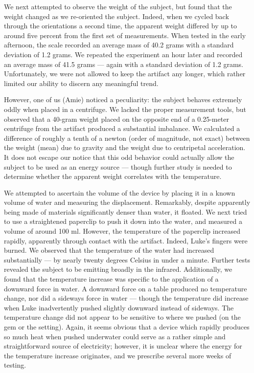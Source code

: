\documentclass[10pt]{article}
\begin{document}
We next attempted to observe the weight of the subject, but found that the weight changed as we re-oriented the subject.
Indeed, when we cycled back through the orientations a second time, the apparent weight differed by up to around five percent from the first set of measurements.
When tested in the early afternoon, the scale recorded an average mass of 40.2 grams with a standard deviation of 1.2 grams.
We repeated the experiment an hour later and recorded an average mass of 41.5 grams --- again with a standard deviation of 1.2 grams.
Unfortunately, we were not allowed to keep the artifact any longer, which rather limited our ability to discern any meaningful trend.

However, one of us (Amie) noticed a peculiarity: the subject behaves extremely oddly when placed in a centrifuge.
We lacked the proper measurement tools, but observed that a 40-gram weight placed on the opposite end of a 0.25-meter centrifuge from the artifact produced a substantial imbalance.
We calculated a difference of roughly a tenth of a newton (order of magnitude, not exact) between the weight (mean) due to gravity and the weight due to centripetal acceleration.
It does not escape our notice that this odd behavior could actually allow the subject to be used as an energy source --- though further study is needed to determine whether the apparent weight correlates with the temperature.

We attempted to ascertain the volume of the device by placing it in a known volume of water and measuring the displacement.
Remarkably, despite apparently being made of materials significantly denser than water, it floated.
We next tried to use a straightened paperclip to push it down into the water, and measured a volume of around 100 ml.
However, the temperature of the paperclip increased rapidly, apparently through contact with the artifact. 
Indeed, Luke's fingers were burned.
We observed that the temperature of the water had increased substantially --- by nearly twenty degrees Celsius in under a minute.
Further tests revealed the subject to be emitting broadly in the infrared.
Additionally, we found that the temperature increase was specific to the application of a downward force in water.
A downward force on a table produced no temperature change, nor did a sideways force in water --- though the temperature did increase when Luke inadvertently pushed slightly downward instead of sideways.
The temperature change did not appear to be sensitive to where we pushed (on the gem or the setting).
Again, it seems obvious that a device which rapidly produces so much heat when pushed underwater could serve as a rather simple and straightforward source of electricity; however, it is unclear where the energy for the temperature increase originates, and we prescribe several more weeks of testing.
\end{document}

